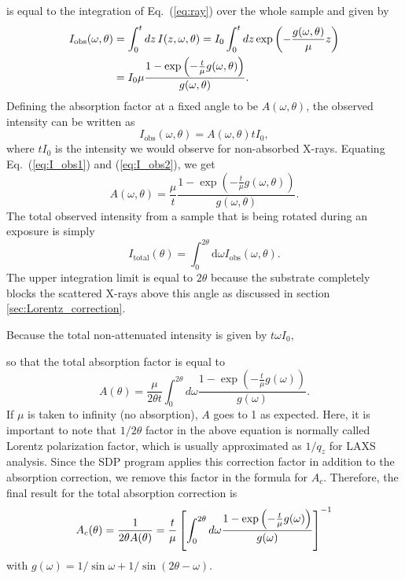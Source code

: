 is equal to the integration
of Eq.~(\ref{eq:ray}) over the whole sample and given by
\begin{align}
  I_{\textrm{obs}}(\omega,\theta) 
    &= \int_0^t \mathop{dz} I(z,\omega,\theta)
     = I_0\int_0^t\mathop{dz} \exp\left(-\frac{g(\omega,\theta)}{\mu}z\right) \nonumber \\
    &= I_0\mu \frac{1-\exp\left(-\frac{t}{\mu}g(\omega,\theta)\right)}{g(\omega,\theta)}.
    \label{eq:I_obs1}
\end{align}
Defining the absorption factor at a fixed angle to be $A(\omega,\theta)$, 
the observed intensity can be written as
\begin{equation}
I_{\textrm{obs}}(\omega,\theta)=A(\omega,\theta)tI_0,
\label{eq:I_obs2}
\end{equation}
where $tI_0$ is the intensity we would observe for non-absorbed X-rays.
Equating Eq.~(\ref{eq:I_obs1}) and (\ref{eq:I_obs2}), we get
\begin{equation}
  A(\omega,\theta) = \frac{\mu}{t} 
                     \frac{1-\exp\left(-\frac{t}{\mu}g(\omega,\theta)\right)}{g(\omega,\theta)}.
\end{equation}
The total observed intensity from a sample that is being rotated during 
an exposure is simply
\begin{equation}
  I_{\textrm{total}}(\theta) 
  = \int_0^{2\theta}\textrm{d}\omega I_{\textrm{obs}}(\omega,\theta).
\end{equation}
The upper integration limit is equal to $2\theta$ because the substrate
completely blocks the scattered X-rays above this angle as discussed in 
section \ref{sec:Lorentz_correction}.

Because the total non-attenuated intensity is given by $t\omega I_0$,


so that the total absorption factor is equal to
\begin{equation}
  A(\theta) = \frac{\mu}{2\theta t} \int_0^{2\theta}d\omega 
      \frac{1-\exp\left(-\frac{t}{\mu}g(\omega)\right)}{g(\omega)}.
\end{equation}
If $\mu$ is taken to infinity (no absorption), $A$ goes to 1 as expected. 
Here, it is important to note that $1/2\theta$ factor in the above equation
is normally called Lorentz polarization factor, which
is usually approximated as $1/q_z$ for LAXS analysis. Since the SDP
program applies this correction factor in addition to the absorption
correction, we remove this factor in the formula for $A_c$. Therefore,
the final result for the total absorption correction is 
\begin{equation}
  A_c(\theta) 
    = \frac{1}{2\theta A(\theta)} \nonumber \\
    = \frac{t}{\mu} 
       \left[ 
         \int_0^{2\theta}d\omega 
         \frac{1-\exp\left(-\frac{t}{\mu}g(\omega)\right)}{g(\omega)}
       \right]^{-1}
\end{equation}
with $g(\omega)=1/\sin\omega+1/\sin(2\theta-\omega)$.

